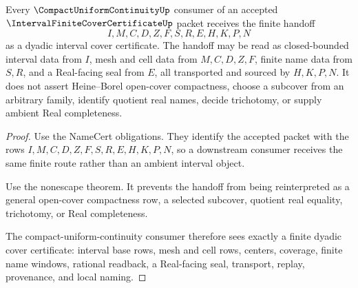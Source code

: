 \begin{theorem}
\label{thm:interval-finite-cover-certificate-compact-uniform-handoff}
Every $\CompactUniformContinuityUp$ consumer of an accepted $\IntervalFiniteCoverCertificateUp$ packet receives the finite handoff
$$
I,M,C,D,Z,F,S,R,E,H,K,P,N
$$
as a dyadic interval cover certificate. The handoff may be read as closed-bounded interval data from $I$, mesh and cell data from $M,C,D,Z,F$, finite name data from $S,R$, and a Real-facing seal from $E$, all transported and sourced by $H,K,P,N$. It does not assert Heine--Borel open-cover compactness, choose a subcover from an arbitrary family, identify quotient real names, decide trichotomy, or supply ambient Real completeness.
\end{theorem}
\begin{proof}
Use the NameCert obligations. They identify the accepted packet with the rows $I,M,C,D,Z,F,S,R,E,H,K,P,N$, so a downstream consumer receives the same finite route rather than an ambient interval object.

Use the nonescape theorem. It prevents the handoff from being reinterpreted as a general open-cover compactness row, a selected subcover, quotient real equality, trichotomy, or Real completeness.

The compact-uniform-continuity consumer therefore sees exactly a finite dyadic cover certificate: interval base rows, mesh and cell rows, centers, coverage, finite name windows, rational readback, a Real-facing seal, transport, replay, provenance, and local naming.
\end{proof}




